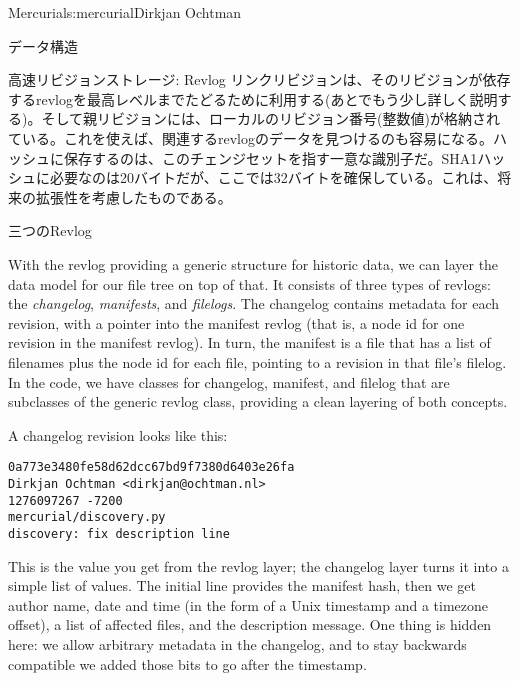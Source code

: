 \begin{aosachapter}{Mercurial}{s:mercurial}{Dirkjan Ochtman}
\begin{aosasect1}{データ構造}
\begin{aosasect2}{高速リビジョンストレージ: Revlog}
リンクリビジョンは、そのリビジョンが依存するrevlogを最高レベルまでたどるために利用する(あとでもう少し詳しく説明する)。そして親リビジョンには、ローカルのリビジョン番号(整数値)が格納されている。これを使えば、関連するrevlogのデータを見つけるのも容易になる。ハッシュに保存するのは、このチェンジセットを指す一意な識別子だ。SHA1ハッシュに必要なのは20バイトだが、ここでは32バイトを確保している。これは、将来の拡張性を考慮したものである。

\end{aosasect2}

\begin{aosasect2}{三つのRevlog}

With the revlog providing a generic structure for historic data, we
can layer the data model for our file tree on top of that. It consists
of three types of revlogs: the \emph{changelog}, \emph{manifests}, and
\emph{filelogs}. The changelog contains metadata for each revision,
with a pointer into the manifest revlog (that is, a node id for one
revision in the manifest revlog). In turn, the manifest is a file that
has a list of filenames plus the node id for each file, pointing to a
revision in that file's filelog. In the code, we have classes for
changelog, manifest, and filelog that are subclasses of the generic
revlog class, providing a clean layering of both concepts.


A changelog revision looks like this:

\begin{verbatim}
0a773e3480fe58d62dcc67bd9f7380d6403e26fa
Dirkjan Ochtman <dirkjan@ochtman.nl>
1276097267 -7200
mercurial/discovery.py
discovery: fix description line
\end{verbatim}

\noindent This is the value you get from the revlog layer; the changelog layer
turns it into a simple list of values. The initial line provides the
manifest hash, then we get author name, date and time (in the form of
a Unix timestamp and a timezone offset), a list of affected files, and
the description message. One thing is hidden here: we allow arbitrary
metadata in the changelog, and to stay backwards compatible we added
those bits to go after the timestamp.


\end{aosasect2}
\end{aosasect1}
\end{aosachapter}
